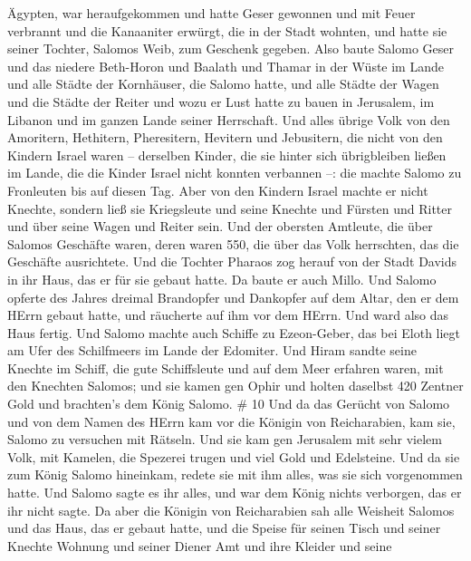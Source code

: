 Ägypten, war heraufgekommen und hatte Geser gewonnen und mit Feuer
verbrannt und die Kanaaniter erwürgt, die in der Stadt wohnten, und
hatte sie seiner Tochter, Salomos Weib, zum Geschenk gegeben.
 Also baute Salomo Geser und das niedere Beth-Horon
 und Baalath und Thamar in der Wüste im Lande 
und alle Städte der Kornhäuser, die Salomo hatte, und alle Städte der
Wagen und die Städte der Reiter und wozu er Lust hatte zu bauen in
Jerusalem, im Libanon und im ganzen Lande seiner Herrschaft.
 Und alles übrige Volk von den Amoritern, Hethitern,
Pheresitern, Hevitern und Jebusitern, die nicht von den Kindern Israel
waren --  derselben Kinder, die sie hinter sich
übrigbleiben ließen im Lande, die die Kinder Israel nicht konnten
verbannen --: die machte Salomo zu Fronleuten bis auf diesen Tag.
 Aber von den Kindern Israel machte er nicht Knechte,
sondern ließ sie Kriegsleute und seine Knechte und Fürsten und Ritter
und über seine Wagen und Reiter sein.  Und der obersten
Amtleute, die über Salomos Geschäfte waren, deren waren 550, die über
das Volk herrschten, das die Geschäfte ausrichtete.  Und
die Tochter Pharaos zog herauf von der Stadt Davids in ihr Haus, das er
für sie gebaut hatte. Da baute er auch Millo.  Und Salomo
opferte des Jahres dreimal Brandopfer und Dankopfer auf dem Altar, den
er dem HErrn gebaut hatte, und räucherte auf ihm vor dem HErrn. Und ward
also das Haus fertig.  Und Salomo machte auch Schiffe zu
Ezeon-Geber, das bei Eloth liegt am Ufer des Schilfmeers im Lande der
Edomiter.  Und Hiram sandte seine Knechte im Schiff, die
gute Schiffsleute und auf dem Meer erfahren waren, mit den Knechten
Salomos;  und sie kamen gen Ophir und holten daselbst 420
Zentner Gold und brachten's dem König Salomo. \# 10  Und da
das Gerücht von Salomo und von dem Namen des HErrn kam vor die Königin
von Reicharabien, kam sie, Salomo zu versuchen mit Rätseln. 
Und sie kam gen Jerusalem mit sehr vielem Volk, mit Kamelen, die
Spezerei trugen und viel Gold und Edelsteine. Und da sie zum König
Salomo hineinkam, redete sie mit ihm alles, was sie sich vorgenommen
hatte.  Und Salomo sagte es ihr alles, und war dem König
nichts verborgen, das er ihr nicht sagte.  Da aber die
Königin von Reicharabien sah alle Weisheit Salomos und das Haus, das er
gebaut hatte,  und die Speise für seinen Tisch und seiner
Knechte Wohnung und seiner Diener Amt und ihre Kleider und seine
